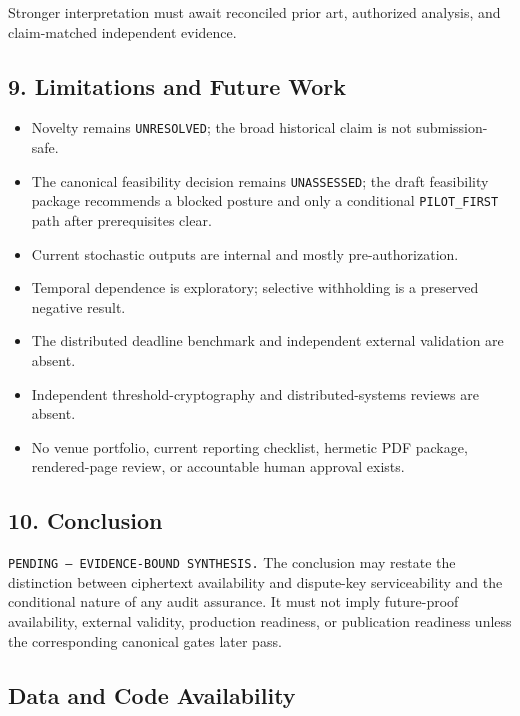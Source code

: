 \documentclass[
]{article}
\providecommand{\tightlist}{%
  \setlength{\itemsep}{0pt}\setlength{\parskip}{0pt}}
\begin{document}
Stronger interpretation must await reconciled prior art, authorized
analysis, and claim-matched independent evidence.

\subsection{9. Limitations and Future
Work}\label{limitations-and-future-work}

\begin{itemize}
\tightlist
\item
  Novelty remains \texttt{UNRESOLVED}; the broad historical claim is not
  submission-safe.
\item
  The canonical feasibility decision remains \texttt{UNASSESSED}; the
  draft feasibility package recommends a blocked posture and only a
  conditional \texttt{PILOT\_FIRST} path after prerequisites clear.
\item
  Current stochastic outputs are internal and mostly pre-authorization.
\item
  Temporal dependence is exploratory; selective withholding is a
  preserved negative result.
\item
  The distributed deadline benchmark and independent external validation
  are absent.
\item
  Independent threshold-cryptography and distributed-systems reviews are
  absent.
\item
  No venue portfolio, current reporting checklist, hermetic PDF package,
  rendered-page review, or accountable human approval exists.
\end{itemize}

\subsection{10. Conclusion}\label{conclusion}

\texttt{PENDING\ —\ EVIDENCE-BOUND\ SYNTHESIS.} The conclusion may
restate the distinction between ciphertext availability and dispute-key
serviceability and the conditional nature of any audit assurance. It
must not imply future-proof availability, external validity, production
readiness, or publication readiness unless the corresponding canonical
gates later pass.

\subsection{Data and Code
Availability}\label{data-and-code-availability}
\end{document}
